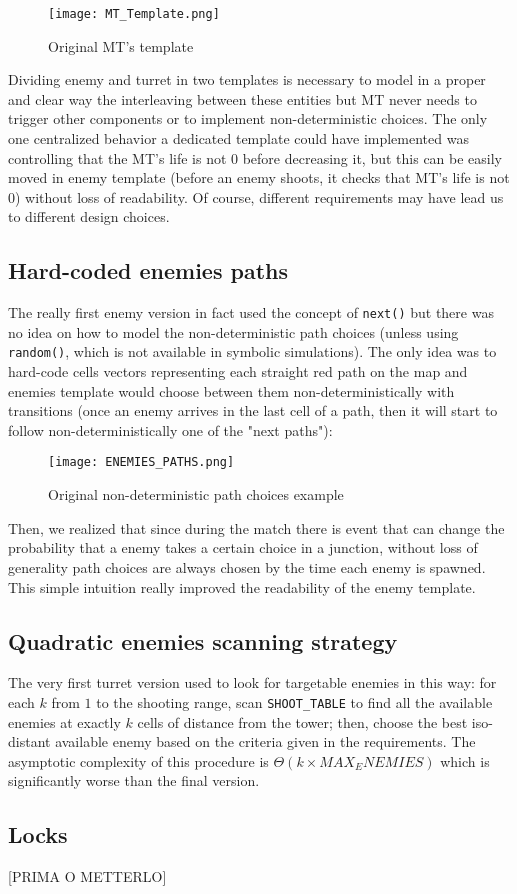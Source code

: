 \documentclass[
10pt, %
a4paper, %
oneside, %
headinclude,footinclude, %
BCOR5mm, %
]{scrartcl}
\begin{document}
	\begin{figure}[h!]
		\centering
		\texttt{[image: MT\_Template.png]}
		\caption{Original MT's template}
	\end{figure}
	Dividing enemy and turret in two templates is necessary to model in a proper and clear way the interleaving between these entities but MT never needs to trigger other components or to implement non-deterministic choices. The only one centralized behavior a dedicated template could have implemented was controlling that the MT's life is not 0 before decreasing it, but this can be easily moved in enemy template (before an enemy shoots, it checks that MT's life is not 0) without loss of readability. Of course, different requirements may have lead us to different design choices.
	\subsection{Hard-coded enemies paths}
	The really first enemy version in fact used the concept of \texttt{next()} but there was no idea on how to model the non-deterministic path choices (unless using \texttt{random()}, which is not available in symbolic simulations). The only idea was to hard-code cells vectors representing each straight red path on the map and enemies template would choose between them non-deterministically with transitions (once an enemy arrives in the last cell of a path, then it will start to follow non-deterministically one of the "next paths"):
	
	\begin{figure}[h!]
		\centering
		\texttt{[image: ENEMIES\_PATHS.png]}
		\caption{Original non-deterministic path choices example}
	\end{figure}
	Then, we realized that since during the match there is event that can change the probability that a enemy takes a certain choice in a junction, without loss of generality path choices are always chosen by the time each enemy is spawned. This simple intuition really improved the readability of the enemy template.
	\subsection{Quadratic enemies scanning strategy}
	The very first turret version used to look for targetable enemies in this way: for each $k$ from $1$ to the shooting range, scan \texttt{SHOOT\_TABLE} to find all the available enemies at exactly $k$ cells of distance from the tower; then, choose the best iso-distant available enemy based on the criteria given in the requirements. The asymptotic complexity of this procedure is $\Theta(k\times MAX_ENEMIES)$ which is significantly worse than the final version.
	\subsection{Locks}
	[PRIMA O METTERLO]
	
\end{document}
